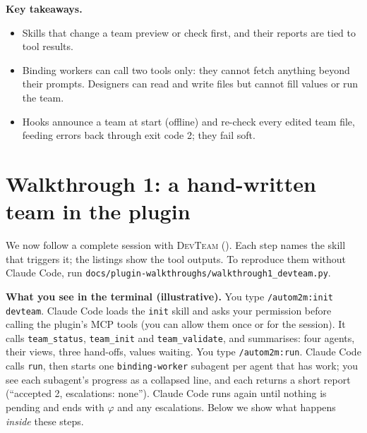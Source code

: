 \documentclass[10pt,a4paper]{article}
\newcommand{\cc}{Claude Code}
\newcommand{\devteam}{\textsc{DevTeam}}
\newcommand{\code}[1]{\texttt{#1}}
\newcommand{\file}[1]{\texttt{#1}}
\newcommand{\mcptool}[1]{\texttt{#1}}
\newcommand{\skill}[1]{\texttt{/autom2m:#1}}
\newenvironment{takeaway}{%
  \begin{tcolorbox}[enhanced, breakable, colback=keybg, colframe=keybg, arc=0pt, boxrule=0pt,
     borderline west={2.2pt}{0pt}{keybar}, left=8pt, right=8pt, top=5pt, bottom=5pt,
     before skip=8pt, after skip=8pt]
  \textsf{\bfseries\color{keybar}Key takeaways.}\par\smallskip}{\end{tcolorbox}}
\begin{document}
\begin{takeaway}
\begin{itemize}
\item Skills that change a team preview or check first, and their reports
are tied to tool results.
\item Binding workers can call two tools only: they cannot fetch anything
beyond their prompts. Designers can read and write files but cannot fill
values or run the team.
\item Hooks announce a team at start (offline) and re-check every edited
team file, feeding errors back through exit code 2; they fail soft.
\end{itemize}
\end{takeaway}

\section{Walkthrough 1: a hand-written team in the plugin}\label{sec:walk1}

We now follow a complete session with \devteam{} (). Each
step names the skill that triggers it; the listings show the tool outputs.
To reproduce them without \cc{}, run
\file{docs/plugin-walkthroughs/walkthrough1_devteam.py}.

\begin{tcolorbox}[enhanced, breakable, colback=rawbg, colframe=rawbg, arc=0pt,
   boxrule=0pt, borderline west={2.2pt}{0pt}{rawbar}, left=8pt, right=8pt, top=5pt, bottom=5pt]
\textsf{\bfseries\color{rawbar}What you see in the terminal (illustrative).}\enspace
You type \skill{init devteam}. \cc{} loads the \code{init} skill and asks
your permission before calling the plugin's MCP tools (you can allow them
once or for the session). It calls \mcptool{team\_status},
\mcptool{team\_init} and \mcptool{team\_validate}, and summarises: four
agents, their views, three hand-offs, values waiting. You type \skill{run}.
\cc{} calls \mcptool{run}, then starts one \code{binding-worker} subagent per
agent that has work; you see each subagent's progress as a collapsed line,
and each returns a short report (``accepted 2, escalations: none''). \cc{}
runs again until nothing is pending and ends with $\varphi$ and any
escalations. Below we show what happens \emph{inside} these steps.
\end{tcolorbox}
\end{document}
